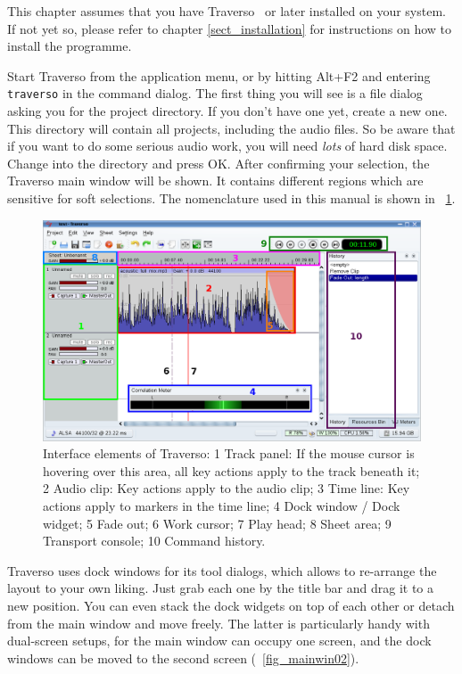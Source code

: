 This chapter assumes that you have Traverso \Version\ or later installed on your system. If not yet so, please refer to chapter \ref{sect_installation} for instructions on how to install the programme.

Start Traverso from the application menu, or by hitting Alt+F2 and entering \texttt{traverso} in the command dialog. The first thing you will see is a file dialog asking you for the project directory. If you don't have one yet, create a new one. This directory will contain all projects, including the audio files. So be aware that if you want to do some serious audio work, you will need \emph{lots} of hard disk space. Change into the directory and press OK. After confirming your selection, the Traverso main window will be shown. It contains different regions which are sensitive for soft selections. The nomenclature used in this manual is shown in \FigT\ \ref{fig_gui01}.

\begin{figure}
 \centering\includegraphics[width=\textwidth]{images/sshot06.png}
 \caption{Interface elements of Traverso: 1 Track panel: If the mouse cursor is hovering over this area, all key actions apply to the track beneath it; 2 Audio clip: Key actions apply to the audio clip; 3 Time line: Key actions apply to markers in the time line; 4 Dock window / Dock widget; 5 Fade out; 6 Work cursor; 7 Play head; 8 Sheet area; 9 Transport console; 10 Command history.}
 \label{fig_gui01}
\end{figure}

Traverso uses dock windows for its tool dialogs, which allows to re-arrange the layout to your own liking. Just grab each one by the title bar and drag it to a new position. You can even stack the dock widgets on top of each other or detach from the main window and move freely. The latter is particularly handy with dual-screen setups, for the main window can occupy one screen, and the dock windows can be moved to the second screen (\FigB\ \ref{fig_mainwin02}).

